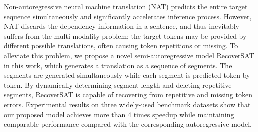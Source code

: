 Non-autoregressive neural machine translation (NAT) predicts the entire target sequence simultaneously and significantly accelerates inference process. However, NAT discards the dependency information in a sentence, and thus inevitably suffers from the multi-modality problem: the target tokens may be provided by different possible translations, often causing token repetitions or missing. To alleviate this problem, we propose a novel semi-autoregressive model RecoverSAT in this work, which generates a translation as a sequence of segments. The segments are generated simultaneously while each segment is predicted token-by-token. By dynamically determining segment length and deleting repetitive segments, RecoverSAT is capable of recovering from repetitive and missing token errors. Experimental results on three widely-used benchmark datasets show that our proposed model achieves more than 4 times speedup while maintaining comparable performance compared with the corresponding autoregressive model.
